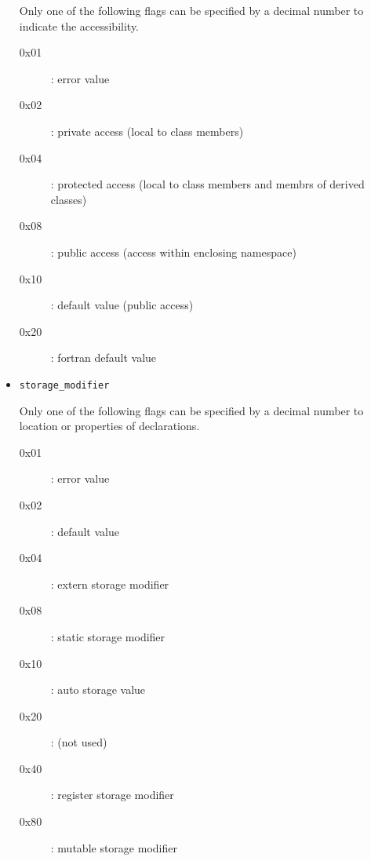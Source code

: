 \begin{itemize}
       Only one of the following flags can be specified by a decimal
       number to indicate the accessibility.
       \begin{description}
	\item[0x01]: error value
	\item[0x02]: private access (local to class members)
	\item[0x04]: protected access (local to class members and membrs of derived classes)
	\item[0x08]: public access (access within enclosing namespace)
	\item[0x10]: default value (public access)
	\item[0x20]: fortran default value
       \end{description}
 \item \texttt{storage\_modifier}

       Only one of the following flags can be specified by a decimal
       number to location or properties of declarations.
       \begin{description}
	\item[0x01]: error value
	\item[0x02]: default value
	\item[0x04]: extern storage modifier 
	\item[0x08]: static storage modifier 
	\item[0x10]: auto storage value 
	\item[0x20]: (not used)
	\item[0x40]: register storage modifier
	\item[0x80]: mutable storage modifier
       \end{description}
\end{itemize}

